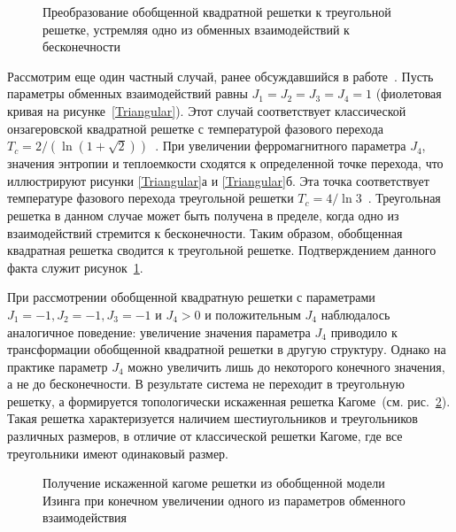 \documentclass[utf8,12pt]{jetp}
\begin{document}
\begin{figure}[h]
	\caption{Преобразование обобщенной квадратной решетки к треугольной решетке, устремляя одно из обменных взаимодействий к бесконечности}
	\label{triag}
\end{figure}

Рассмотрим еще один частный случай, ранее обсуждавшийся в работе~\cite{generalizedIsing2021}. Пусть параметры обменных взаимодействий равны $J_1 = J_2 = J_3 = J_4 = 1$ (фиолетовая кривая на рисунке~\ref{Triangular}). Этот случай соответствует классической онзагеровской квадратной решетке с температурой фазового перехода $T_c = 2/(\ln (1+\sqrt{2}))$~\cite{kramers_wannier1, kramers_wannier2}. При увеличении ферромагнитного параметра $J_4$, значения энтропии и теплоемкости сходятся к определенной точке перехода, что иллюстрируют рисунки \ref{Triangular}а и \ref{Triangular}б. Эта точка соответствует температуре фазового перехода треугольной решетки $T_c = 4/\ln 3$~\cite{wannier1950}. Треугольная решетка в данном случае может быть получена в пределе, когда одно из взаимодействий стремится к бесконечности. Таким образом, обобщенная квадратная решетка сводится к треугольной решетке. Подтверждением данного факта служит рисунок~\ref{triag}. 

При рассмотрении обобщенной квадратную решетки с параметрами $J_1 = -1, J_2 = -1, J_3 = -1$ и $J_4 > 0$ и положительным $J_4$ наблюдалось аналогичное поведение: увеличение значения параметра $J_4$ приводило к трансформации обобщенной квадратной решетки в другую структуру. Однако на практике параметр $J_4$ можно увеличить лишь до некоторого конечного значения, а не до бесконечности. В результате система не переходит в треугольную решетку, а формируется топологически искаженная решетка Кагоме~(см. рис.~\ref{kagomelike}). Такая решетка характеризуется наличием шестиугольников и треугольников различных размеров, в отличие от классической решетки Кагоме, где все треугольники имеют одинаковый размер. 

\begin{figure}[h]
	\caption{Получение искаженной кагоме решетки из обобщенной модели Изинга при конечном увеличении одного из параметров обменного взаимодействия}
	\label{kagomelike}
\end{figure}
\end{document}
